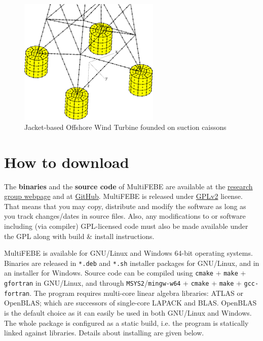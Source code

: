\documentclass[a4paper,fleqn]{book}
\begin{document}
\begin{figure}[h]
\centering
\includegraphics[width=0.6\textwidth]{figures/shell_fe.eps}
\caption{Jacket-based Offshore Wind Turbine founded on suction caissons}
\label{fig:owt}
\end{figure}


%
%

%
%

\section{How to download}

The \textbf{binaries} and the \textbf{source code} of MultiFEBE are available at the \href{http://www.mmc.siani.es/}{research group webpage} and at \href{https://github.com/mmc-siani-es/MultiFEBE}{GitHub}. MultiFEBE is released under \href{https://github.com/mmc-siani-es/MultiFEBE/blob/main/LICENSE}{GPLv2} license. That means that you may copy, distribute and modify the software as long as you track changes/dates in source files. Also, any modifications to or software including (via compiler) GPL-licensed code must also be made available under the GPL along with build \& install instructions.

MultiFEBE is available for GNU/Linux and Windows 64-bit operating systems. Binaries are released in \texttt{*.deb} and \texttt{*.sh} installer packages for GNU/Linux, and in an  installer for Windows. Source code can be compiled using \texttt{cmake} + \texttt{make} + \texttt{gfortran} in GNU/Linux, and through \texttt{MSYS2}/\texttt{mingw-w64} + \texttt{cmake} + \texttt{make} + \texttt{gcc-fortran}. The program requires multi-core linear algebra libraries: ATLAS or OpenBLAS; which are successors of single-core LAPACK and BLAS. OpenBLAS is the default choice as it can easily be used in both GNU/Linux and Windows. The whole package is configured as a static build, i.e. the program is statically linked against libraries. Details about installing are given below. 
\end{document}
